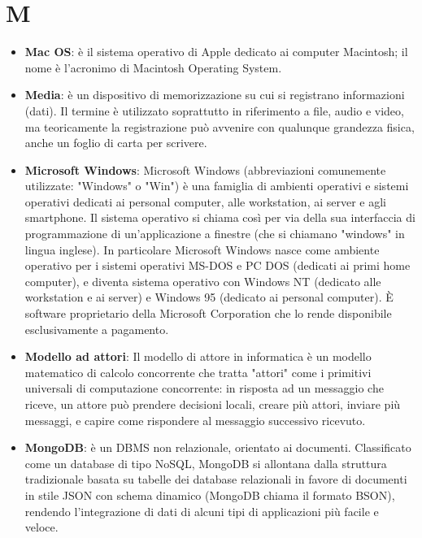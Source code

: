 \section{M}
\begin{itemize} 
	\item
	\textbf{Mac OS}: è il sistema operativo di Apple dedicato ai computer Macintosh; il nome è l'acronimo di Macintosh Operating System.
	\item
	\textbf{Media}: è un dispositivo di memorizzazione su cui si registrano informazioni (dati). Il termine è utilizzato soprattutto in riferimento a file, audio e video, ma teoricamente la registrazione può avvenire con qualunque grandezza fisica, anche un foglio di carta per scrivere.
	\item
	\textbf{Microsoft Windows}: Microsoft Windows (abbreviazioni comunemente utilizzate: "Windows" o "Win") è una famiglia di ambienti operativi e sistemi operativi dedicati ai personal computer, alle workstation, ai server e agli smartphone. Il sistema operativo si chiama così per via della sua interfaccia di programmazione di un'applicazione a finestre (che si chiamano "windows" in lingua inglese).
	In particolare Microsoft Windows nasce come ambiente operativo per i sistemi operativi MS-DOS e PC DOS (dedicati ai primi home computer), e diventa sistema operativo con Windows NT (dedicato alle workstation e ai server) e Windows 95 (dedicato ai personal computer). È software proprietario della Microsoft Corporation che lo rende disponibile esclusivamente a pagamento.
	\item
	\textbf{Modello ad attori}: Il modello di attore in informatica è un modello matematico di calcolo concorrente che tratta "attori" come i primitivi universali di computazione concorrente: in risposta ad un messaggio che riceve, un attore può prendere decisioni locali, creare più attori, inviare più messaggi, e capire come rispondere al messaggio successivo ricevuto. 
	\item
	\textbf{MongoDB}: è un DBMS non relazionale, orientato ai documenti. Classificato come un database di tipo NoSQL, MongoDB si allontana dalla struttura tradizionale basata su tabelle dei database relazionali in favore di documenti in stile JSON con schema dinamico (MongoDB chiama il formato BSON), rendendo l'integrazione di dati di alcuni tipi di applicazioni più facile e veloce.  
\end{itemize}
